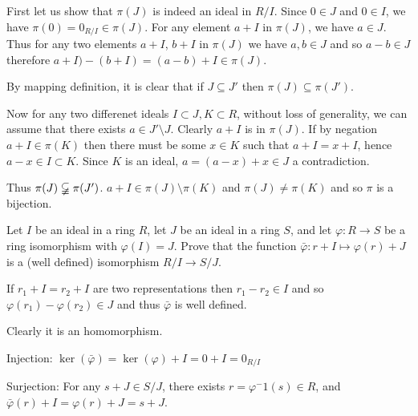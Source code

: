 \begin{myenumerate}
First let us show that \(\pi(J)\) is indeed an ideal in \(R/I\).
Since \(0\in J\) and \(0\in I\), we have \(\pi(0)=0_{R/I}\in\pi(J)\).
For any element \(a+I\) in \(\pi(J)\), we have \(a\in J\).
Thus for any two elements \(a+I\), \(b+I\) in \(\pi(J)\)
we have \(a,b\in J\) and so \(a-b \in J\) therefore
\(a+I)-(b+I)=(a-b)+I\in \pi(J)\).

By mapping definition, it is clear
that if  \(J\subseteq J'\) then \(\pi(J)\subseteq \pi(J')\).
\iffalse
Now let assume that \(J\varsubsetneqq J'\)
and let \(a\in J'\setminus J\).
Clearly \(a+I\) is in \(\pi(J')\). If by negation
\(a+I\in \pi(J)\) then there must be some
\(x\in J\) such that \(a+I=x+I\), hence \(a-x\in I\subset J\).
Since $J$ is an ideal, \(a\in J\) a contradiction.
Thus \(\pi(J)\varsubsetneqq \pi(J')\).
\fi

Now for any two differenet ideals \(I\subset J,K \subset R\),
without loss of generality, we can assume that
there exists \(a\in J'\setminus J\).
Clearly \(a+I\) is in \(\pi(J)\). If by negation
\(a+I\in \pi(K)\) then there must be some
\(x\in K\) such that \(a+I=x+I\), hence \(a-x\in I\subset K\).
Since $K$ is an ideal, \(a=(a-x)+x\in J\) a contradiction.

Thus \(\pi(J)\varsubsetneqq \pi(J')\).
\(a+I\in \pi(J)\setminus \pi(K)\) and
\(\pi(J)\neq \pi(K)\) and so \(\pi\) is a bijection.


\item
\begin{excopy}
Let $I$ be an ideal in a ring $R$, let $J$ be an ideal in a ring $S$,
and let \(\varphi:R \rightarrow S\) be a ring isomorphism with
\(\varphi(I)=J\). Prove that the function
\(\bar{\varphi}:r+I \mapsto \varphi(r)+J\) is a (well defined) isomorphism
\(R/I \rightarrow S/J\).
\end{excopy}

If \(r_1+I = r_2+I\) are two representations then \(r_1-r_2\in I\)
and so \(\varphi(r_1)-\varphi(r_2)\in J\) and thus
\(\bar{\varphi}\) is well defined.

Clearly it is an homomorphism.

Injection: \(\ker(\bar\varphi)=\ker(\varphi)+I=0+I=0_{R/I}\)

Surjection:  For any \(s+J\in S/J\), there exists
\(r=\varphi^-1(s)\in R\), and
\(\bar{\varphi}(r)+I=\varphi(r)+J=s+J\).

\end{myenumerate}



